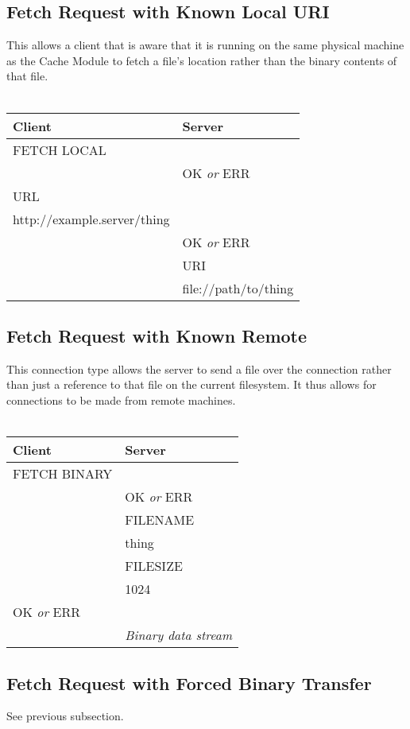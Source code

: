\documentclass[letterpaper]{article}
\begin{document}
\subsection{Fetch Request with Known Local URI}
This allows a client that is aware that it is running on the same physical machine as the Cache Module to fetch a file's location rather than the binary contents of that file.
\\
\\
\begin{tabular}{|l|l|}
\hline
\textbf{Client} & \textbf{Server}\\
\hline
\hline
FETCH LOCAL &\\
\hline
& OK \textit{or} ERR\\
\hline
URL & \\
http://example.server/thing & \\
\hline
& OK \textit{or} ERR\\
& URI\\
& file://path/to/thing\\
\hline
\end{tabular}

\subsection{Fetch Request with Known Remote}
This connection type allows the server to send a file over the connection rather than just a reference to that file on the current filesystem. It thus allows for connections to be made from remote machines. 
\\
\\
\begin{tabular}{|l|l|}
\hline
\textbf{Client} & \textbf{Server}\\
\hline
\hline
FETCH BINARY &\\
\hline
& OK \textit{or} ERR\\
\hline
& FILENAME \\
& thing \\
\hline
& FILESIZE \\
& 1024 \\
\hline
OK \textit{or} ERR & \\
\hline
& \textit{Binary data stream}\\
\hline
\end{tabular}

\subsection{Fetch Request with Forced Binary Transfer}
See previous subsection.
\end{document}
